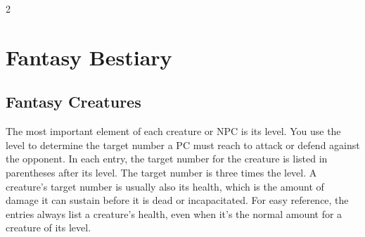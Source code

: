 \begin{multicols}{2}

\chapter{Fantasy Bestiary}

\section{Fantasy Creatures}

The most important element of each creature or NPC is its level. You use the level to determine the target number a PC must reach to attack or defend against the opponent. In each entry, the target number for the creature is listed in parentheses after its level. The target number is three times the level.
	A creature’s target number is usually also its health, which is the amount of damage it can sustain before it is dead or incapacitated. For easy reference, the entries always list a creature’s health, even when it’s the normal amount for a creature of its level. 

\end{multicols}

